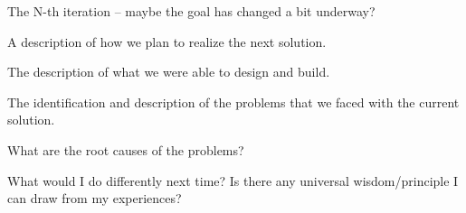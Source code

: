 \iteration
The N-th iteration – maybe the goal has changed a bit underway? 

\plan
A description of how we plan to realize the next solution. 

\results 
The description of what we were able to design and build. 

\problems
The identification and description of the problems that we faced with the current solution. 

\diagnosis
What are the root causes of the problems? 

\principles
What would I do differently next time? Is there any universal wisdom/principle I can draw from my experiences? 